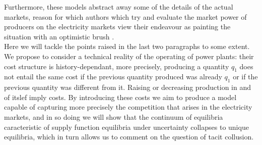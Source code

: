 Furthermore, these models abstract away some of the details of the actual markets, reason for which authors which try and evaluate the market power of producers on the electricity markets view their endeavour as painting the situation with an optimistic brush \cite{Newgreen}. \\

Here we will tackle the points raised in the last two paragraphs to some extent. We propose to consider a technical reality of the operating of power plants: their cost structure is history-dependant, more precisely, producing a quantity $q_1$ does not entail the same cost if the previous quantity produced was already $q_1$ or if the previous quantity was different from it. Raising or decreasing production in and of itslef imply costs. By introducing these costs we aim to produce a model capable of capturing more precisely the competition that arises in the electricity markets, and in so doing we will show that the continuum of equilibria caracteristic of supply function equilibria under uncertainty collapses to unique equilibria, which in turn allows us to comment on the question of tacit collusion.\\


%
%
%
%
%

